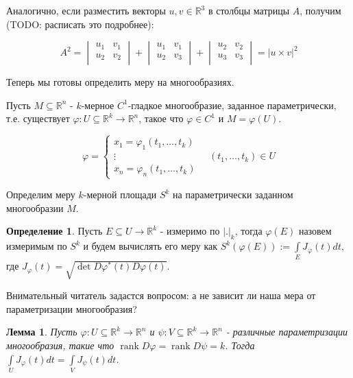 \documentclass[a5paper]{article}
\newcounter{through}
\theoremstyle{plain}
\newtheorem{lemma}[through]{Лемма}
\theoremstyle{definition}
\newtheorem{definition}[through]{Определение}
\numberwithin{through}{section}
\numberwithin{equation}{section}
\DeclareMathOperator{\rank}{rank}
\begin{document}
Аналогично, если разместить векторы $u, v \in \mathbb{R}^3$ в столбцы матрицы $A$, получим (TODO: расписать это подробнее):

\begin{equation*}
	A^2 = 
	\begin{vmatrix}
		u_1 & v_1 \\
		u_2 & v_2 \\
	\end{vmatrix}
	+
	\begin{vmatrix}
	u_1 & v_1 \\
	u_2 & v_3 \\
	\end{vmatrix}
		+
	\begin{vmatrix}
	u_2 & v_2 \\
	u_3 & v_3 \\
	\end{vmatrix}
	= |u \times v|^2
\end{equation*}

Теперь мы готовы определить меру на многообразиях.

Пусть $M \subseteq \mathbb{R}^n$ - $k$-мерное $C^1$-гладкое многообразие, заданное параметрически, т.е. существует $\varphi : U \subseteq \mathbb{R}^k \to \mathbb{R}^n$, такое что $\varphi \in C^1$ и $M=\varphi(U)$. 

\begin{equation*}
\varphi = 
\begin{cases}
	x_1 = \varphi_1(t_1, \ldots, t_k) \\
	\vdots \\
	x_n = \varphi_n(t_1, \ldots, t_k)
\end{cases}
\quad 
(t_1, \ldots, t_k) \in U
\end{equation*}

Определим меру $k$-мерной площади $S^k$ на параметрически заданном многообразии $M$.

\begin{definition}
	Пусть $E \subseteq U \to \mathbb{R}^k$ - измеримо по $|.|_k$, тогда $\varphi(E)$ назовем измеримым по $S^k$ и будем вычислять его меру как $S^k(\varphi(E)) := \int\limits_{E} J_{\varphi}(t)dt$, где $J_{\varphi}(t)=\sqrt{\det D \varphi^*(t) D \varphi(t)}$.
\end{definition}

Внимательный читатель задастся вопросом: а не зависит ли наша мера от параметризации многообразия?

\begin{lemma}
	Пусть  $\varphi : U \subseteq \mathbb{R}^k \to \mathbb{R}^n$ и  $\psi : V \subseteq \mathbb{R}^k \to \mathbb{R}^n$ - различные параметризации многообразия, такие что $\rank D \varphi = \rank D \psi = k$. Тогда $\int\limits_{U} J_{\varphi}(t)dt = \int\limits_{V} J_{\psi}(t)dt$.
\end{lemma}
\end{document}
